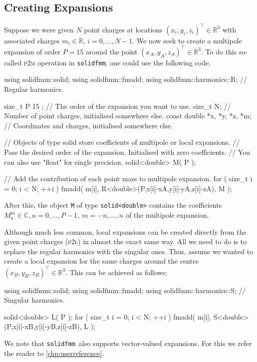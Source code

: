 \documentclass{scrbook}
\newcommand{\solidfmm}{\texttt{solidfmm}}
\newcommand{\reals}{\ensuremath{\mathbb{R}}}
\newcommand{\complex}{\mathbb{C}}
\newcommand{\wholespace}{\ensuremath{\reals^3}}
\begin{document}
\subsection{Creating Expansions}
Suppose we were given $N$ point charges at locations $(x_i,y_i,z_i)^\top
\in\wholespace$ with associated charges $m_i\in\reals$, $i=0,\dotsc,N-1$. We
now seek to create a multipole expansion of order $P=\text{15}$ around the point
$(x_A,y_A,z_A)^\top\in\wholespace$. To do this so-called \textsc{p2m} operation
in
\solidfmm, one could use the following code.
\begin{cppcode*}
using solidfmm::solid;
using solidfmm::fmadd;
using solidfmm::harmonics::R; // Regular harmonics.

size_t P { 15 };             // The order of the expansion you want to use.
size_t N;                    // Number of point charges, initialised somewhere else.
const double *x, *y, *z, *m; // Coordinates and charges, initialised somewhere else.

// Objects of type solid store coefficients of multipole or local expansions.
// Pass the desired order of the expansion. Initialised with zero coefficients.
// You can also use "float" for single precision.
solid<double> M( P ); 

// Add the contribution of each point mass to multipole expansion.
for ( size_t i = 0; i < N; ++i )
    fmadd( m[i], R<double>(P,x[i]-xA,y[i]-yA,z[i]-zA), M );
\end{cppcode*}

After this, the object \lstinline|M| of type \lstinline|solid<double>| contains
the coefficients $M_n^m\in\complex, n=0,\dotsc,P-1,\ m=-n,\dotsc,n$ of the
multipole expansion.

Although much less common, local expansions can be created directly from the
given point charges (\textsc{p2l}) in almost the exact same way. All we need to
do is to replace the regular harmonics with the singular ones. Thus, assume we
wanted to create a local expansion for the same charges around the centre
$(x_B,y_B,z_B)^\top\in\wholespace$. This can be achieved as follows:
\begin{cppcode*}
using solidfmm::solid;
using solidfmm::fmadd;
using solidfmm::harmonics::S; // Singular harmonics.

solid<double> L( P ); 
for ( size_t i = 0; i < N; ++i )
    fmadd( m[i], S<double>(P,x[i]-xB,y[i]-yB,z[i]-zB), L );
\end{cppcode*}

We note that \solidfmm\ also supports vector-valued expansions. For this we
refer the reader to \cref{chp:userreference}.
\end{document}
